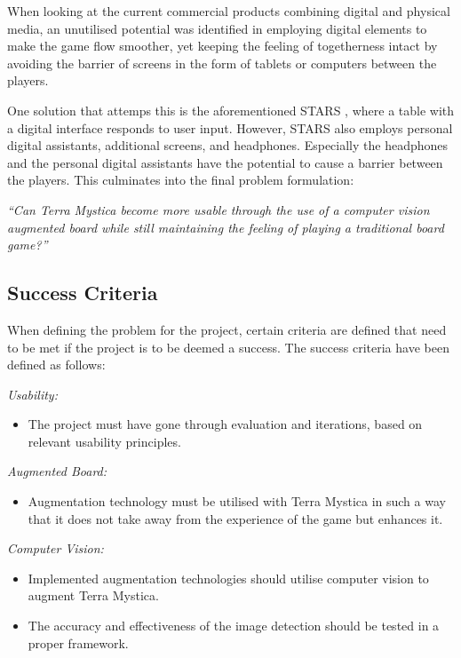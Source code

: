 When looking at the current commercial products combining digital and physical media, an unutilised potential was identified in employing digital elements to make the game flow smoother, yet keeping the feeling of togetherness intact by avoiding the barrier of screens in the form of tablets or computers between the players. 

One solution that attemps this is the aforementioned STARS \citep{magStars}, where a table with a digital interface responds to user input. However, STARS also employs personal digital assistants, additional screens, and headphones. Especially the headphones and the personal digital assistants have the potential to cause a barrier between the players. This culminates into the final problem formulation:

\textit{“Can Terra Mystica become more usable through the use of a computer vision augmented board while still maintaining the feeling of playing a traditional board game?”}

\subsection{Success Criteria}\label{sec:SuccessCriteria}
When defining the problem for the project, certain criteria are defined that need to be met if the project is to be deemed a success. The success criteria have been defined as follows:

\textit{Usability:}
\begin{itemize}
	\item The project must have gone through evaluation and iterations, based on relevant usability principles.
\end{itemize}
\textit{Augmented Board:}
\begin{itemize}
	\item Augmentation technology must be utilised with Terra Mystica in such a way that it does not take away from the experience of the game but enhances it.
\end{itemize}
\textit{Computer Vision:}
\begin{itemize}
	\item Implemented augmentation technologies should utilise computer vision to augment Terra Mystica.
	\item The accuracy and effectiveness of the image detection should be tested in a proper framework.
\end{itemize} 